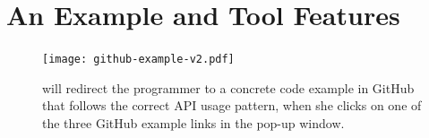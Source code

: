 \section{An Example and Tool Features}
\label{sec:motivation}
%

\begin{figure}
\centering
\texttt{[image: github-example-v2.pdf]}
  \caption{{\tool} will redirect the programmer to a concrete code example in GitHub that follows the correct API usage pattern, when she clicks on one of the three GitHub example links in the pop-up window.\protect\footnotemark}
  \label{fig:github}
\end{figure}


